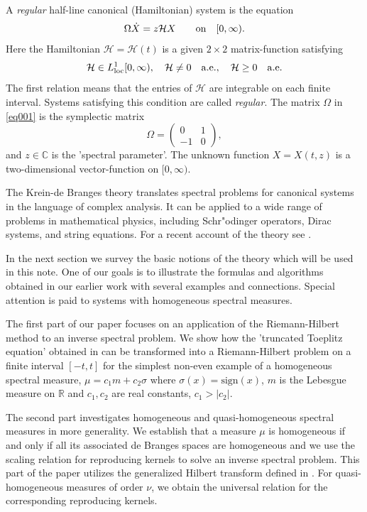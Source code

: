 \documentclass[11pt,twoside,reqno]{amsart}
\def\R{{\mathbb R}}
\def\C{{\mathbb{C}}}
\def\HH{{\mathcal H}}
\theoremstyle{plain}
\numberwithin{equation}{section}
\begin{document}
A {\it regular} half-line canonical (Hamiltonian) system is the equation
\begin{equation}
	\Omega\dot X=z\HH X\qquad {\rm on}\quad [0,\infty).\label{eq001A}
\end{equation}
Here the Hamiltonian $\HH=\HH(t)$ is  a  given $2\times 2$ matrix-function satisfying
$$\HH\in L^1_{\rm loc}[0,\infty),\quad \HH\ne 0\quad {\rm a.e.},\quad \HH\ge 0\quad {\rm a.e.}$$
The first relation means that the entries of $\HH$ are integrable on each finite interval. Systems satisfying this condition are called {\it regular}. 
The matrix $\Omega$ in \eqref{eq001} is the symplectic matrix $$\Omega=\begin{pmatrix} 0&1\\-1&0\end{pmatrix},$$ and $z\in\C$ is the 'spectral parameter'. The unknown function 
$X=X(t,z)$ is a two-dimensional vector-function on $[0,\infty)$.



The Krein-de Branges theory translates spectral problems for canonical systems in the language of complex analysis. It can be applied  to a wide range of problems in mathematical physics, including Schr"odinger operators, Dirac systems, and string equations. For a recent account of the theory see \cite{Rem}.


In the next section we survey the basic notions of the theory which will be used in this note. One of our goals is to illustrate the formulas and 
algorithms obtained in our earlier work \cite{MIF1, etudes, MP3} with several examples and connections. Special attention is paid to systems with homogeneous spectral measures.


The first part of our paper focuses on an application of the Riemann-Hilbert method to  an inverse spectral problem. We show how the 'truncated Toeplitz equation' obtained in \cite{etudes} can be transformed into a Riemann-Hilbert problem on a finite interval $[-t,t]$ for the simplest non-even example of a homogeneous spectral measure, 
 $\mu = c_1 m + c_2 \sigma$ where $\sigma(x) = \text{sign}(x)$, $m$ is the Lebesgue measure on $\R$ and $c_1,c_2$ are real constants, 
 $c_1>|c_2|$. 
 

The second part investigates homogeneous and quasi-homogeneous spectral measures in more generality. We establish that a measure $\mu$ is homogeneous if and only if all its associated de Branges spaces are homogeneous and we use the  scaling relation  for reproducing kernels to solve an inverse spectral problem. This part of the paper utilizes the generalized Hilbert transform defined in \cite{etudes}.
For quasi-homogeneous measures of order $\nu$, we obtain the universal relation for the corresponding reproducing kernels.
\end{document}
